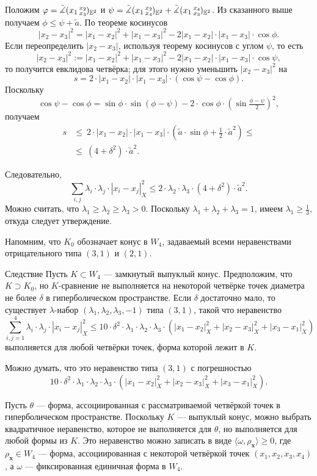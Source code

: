 Положим $\varphi=\tilde\measuredangle(x_1\,{}^{x_2}_{x_3}\hspace{-0.2ex})_{\mathbb{E}^2}$ и $\psi=\tilde\measuredangle(x_1\,{}^{x_2}_{x_4}\hspace{-0.2ex})_{\mathbb{E}^2}+\tilde\measuredangle(x_1\,{}^{x_4}_{x_3}\hspace{-0.2ex})_{\mathbb{E}^2}$.
Из сказанного выше получаем $\phi\leqslant \psi+\tilde a$.
По теореме косинусов
\[|x_2-x_3|^2=|x_1-x_2|^2+ |x_1-x_3|^2-2|x_1-x_2|\cdot|x_1-x_3|\cdot\cos\phi.\]
Если переопределить $|x_2-x_3|$, используя теорему косинусов с углом $\psi$, то есть
\[|x_2-x_3|^2\mathrel{:=}|x_1-x_2|^2+ |x_1-x_3|^2-2|x_1-x_2|\cdot|x_1-x_3|\cdot\cos\psi,\]
то получится евклидова четвёрка; для этого нужно уменьшить $|x_2-x_3|^2$ на
\[s=2\cdot |x_1-x_2|\cdot|x_1-x_3|\cdot(\cos\psi-\cos\phi).\]
Поскольку
\[\cos\psi-\cos\phi=\sin\phi\cdot\sin(\phi-\psi)-2\cdot\cos\phi\cdot (\sin\tfrac{\phi-\psi}2)^2,\]
получаем
\begin{align*}
s
&\leqslant\
2\cdot|x_1-x_2|\cdot|x_1-x_3|\cdot (\tilde a\cdot\sin\phi+\tfrac12\cdot\tilde a^2)
\leqslant
\\
&\leqslant\ (4+\delta^2)\cdot \tilde a^2.
\end{align*}

Следовательно,
\[\sum_{i,j}\lambda_i\cdot\lambda_j\cdot|x_i-x_j|_X^2
\leqslant
2\cdot\lambda_2\cdot\lambda_3\cdot(4+\delta^2)\cdot \tilde a^2.\]
Можно считать, что $\lambda_1\geqslant \lambda_2\geqslant \lambda_3>0$.
Поскольку $\lambda_1+ \lambda_2+ \lambda_3=1$, имеем $\lambda_1\geqslant \tfrac13$, откуда следует утверждение.
\qeds

Напомним, что $K_0$ обозначает конус в $W_4$, задаваемый всеми неравенствами отрицательного типа $(3,1)$ и $(2,1)$.

\begin{thm}{Следствие}\label{cor:squared-sides}
Пусть $K\subset W_4$ --- замкнутый выпуклый конус.
Предположим, что $K\supset K_0$, но $K$-сравнение не выполняется на некоторой четвёрке точек диаметра не более $\delta$ в гиперболическом пространстве.
Если $\delta$ достаточно мало,
то существует $\lambda$-набор $(\lambda_1,\lambda_2,\lambda_3,-1)$ типа $(3,1)$,
такой что неравенство
\[\sum_{i,j=1}^4\lambda_i\cdot\lambda_j\cdot|x_i-x_j|_X^2
\leqslant
10\cdot\delta^2\cdot \lambda_1\cdot\lambda_2\cdot\lambda_3\cdot (|x_1-x_2|_X^2+|x_2-x_3|_X^2+|x_3-x_1|_X^2)\]
выполняется для любой четвёрки точек, форма которой лежит в $K$.
\end{thm}

Можно думать, что это неравенство типа $(3,1)$ с погрешностью
\[10\cdot\delta^2\cdot \lambda_1\cdot\lambda_2\cdot\lambda_3\cdot (|x_1-x_2|_X^2+|x_2-x_3|_X^2+|x_3-x_1|_X^2).\]

Пусть $\theta$ --- форма, ассоциированная с рассматриваемой четвёркой точек в гиперболическом пространстве.
Поскольку $K$ --- выпуклый конус, можно выбрать квадратичное неравенство, которое не выполняется для $\theta$, но выполняется для любой формы из $K$.
Это неравенство можно записать в виде $\langle \omega,\rho_{\bm{x}} \rangle\geqslant 0$, где $\rho_{\bm{x}}\in W_4$ --- форма, ассоциированная с некоторой четвёркой точек $(x_1,x_2,x_3,x_4)$, а $\omega$ --- фиксированная единичная форма в $W_4$.

